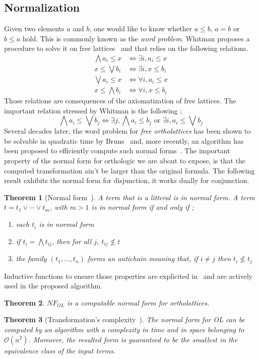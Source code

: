 \documentclass[a4paper, 11pt]{article}
\newtheorem{theorem}{Theorem}
\begin{document}
    \subsection{Normalization}
    Given two elements $a$ and $b$, one would like to know whether $a\leq b$, $a=b$ or 
    $b\leq a$ hold. This is commonly known as the \textit{word problem}. Whitman proposes a procedure to
    solve it on free lattices~\cite{43df3167-5a81-387d-88d7-2d29cdf1c881} and that relies on
    the following relations.
    \begin{align}
	    \bigwedge a_i\leq x&\Leftrightarrow\exists i,a_i\leq x\\
	    x\leq\bigvee b_i&\Leftrightarrow\exists i,x\leq b_i\\
	    \bigvee a_i\leq x&\Leftrightarrow\forall i,a_i\leq x\\
	    x\leq\bigwedge b_i&\Leftrightarrow\forall i,x\leq b_i
    \end{align}
    Those relations are consequences of the axiomatization of free lattices. The important relation
    stressed by Whitman is the following ;
    \[
	    \bigwedge a_i\leq\bigvee b_j\Leftrightarrow\exists j,\bigwedge a_i\leq b_j\text{ or }
	    \exists i,a_i\leq\bigvee b_j
    \]
    Several decades later, the word problem for \textit{free ortholattices} has been shown to be 
    solvable in quadratic time by Bruns~\cite{Bruns_1976} and, more recently, an algorithm has 
    been proposed to efficiently compute such normal forms~\cite{10.1007/978-3-031-37709-9_19}. The
    important property of the normal form for orthologic we are about to expose, is that the
    computed transformation ain't be larger than the original formula. The following result exhibits
    the normal form for disjunction, it works dually for conjunction.
    \begin{theorem}[Normal form~\cite{free_lattices_ams}]
    A term that is a litteral is in normal form. A term $t=t_1\vee\cdots\vee t_m$, with $m>1$ is in 
	    normal form if and only if ;
    \begin{enumerate}
	    \item
		    each $t_i$ is in normal form
	    \item
		    if $t_i=\bigwedge t_{ij}$, then for all $j$, $t_{ij}\not\leq t$
	    \item
		    the family $(t_1,...,t_n)$ forms an antichain meaning that, if $i\neq j$ then 
		    $t_i\not\leq t_j$
    \end{enumerate} 
    \end{theorem}
    Inductive functions to ensure those properties are explicited in~\cite{10.1007/978-3-031-37709-9_19}
    and are actively used in the proposed algorithm.
    \begin{theorem}
	    $NF_{OL}$ is a computable normal form for ortholattices.
    \end{theorem}
    \begin{theorem}[Transformation's complexity~\cite{10.1007/978-3-031-37709-9_19}]
	    The normal form for OL can be computed by an algorithm with a complexity in time and in space
	    belonging to $\mathcal{O}(n^2)$. Moreover, the resulted form
	    is guaranteed to be the smallest in the equivalence class of the input terms.
    \end{theorem}
\end{document}
